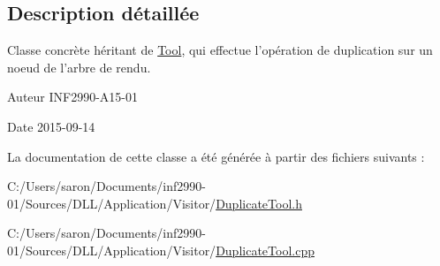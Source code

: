 \subsection{Description détaillée}
Classe concrète héritant de \hyperlink{class_tool}{Tool}, qui effectue l'opération de duplication sur un noeud de l'arbre de rendu. 

\begin{DoxyAuthor}{Auteur}
I\-N\-F2990-\/\-A15-\/01 
\end{DoxyAuthor}
\begin{DoxyDate}{Date}
2015-\/09-\/14 
\end{DoxyDate}


La documentation de cette classe a été générée à partir des fichiers suivants \-:\begin{DoxyCompactItemize}
\item 
C\-:/\-Users/saron/\-Documents/inf2990-\/01/\-Sources/\-D\-L\-L/\-Application/\-Visitor/\hyperlink{_duplicate_tool_8h}{Duplicate\-Tool.\-h}\item 
C\-:/\-Users/saron/\-Documents/inf2990-\/01/\-Sources/\-D\-L\-L/\-Application/\-Visitor/\hyperlink{_duplicate_tool_8cpp}{Duplicate\-Tool.\-cpp}\end{DoxyCompactItemize}
